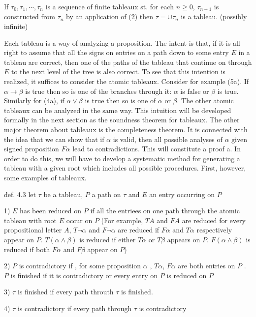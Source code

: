 \documentclass[a4paper, 10pt]{ctexbook} %
\begin{document}
If $\tau_0 , \tau_1 , \cdots , \tau_{n}$ is a sequence of finite tableaux st. for each $n \ge 0$, $\tau _{n+1}$ is constructed from $\tau_{n}$ by an application of (2) then $\tau = \cup \tau_{n}$ is a tableau. (possibly infinite)

Each tableau is a way of analyzing a proposition. The intent is that, if
it is all right to assume that all the signs on entries on a path down to some
entry $E$ in a tableau are correct, then one of the paths of the tableau that
continue on through $E$ to the next level of the tree is also correct. To see
that this intention is realized, it suffices to consider the atomic tableaux.
Consider for example (5a). If $\alpha \to \beta$ is true then so is one of the branches
through it: $\alpha$ is false or $\beta$ is true. Similarly for (4a), if $\alpha \vee \beta$ is true then so
is one of $\alpha$ or $\beta$. The other atomic tableaux can be analyzed in the same
way. This intuition will be developed formally in the next section as the
soundness theorem for tableaux. The other major theorem about tableaux
is the completeness theorem. It is connected with the idea that we can show
that if $\alpha$ is valid, then all possible analyses of $\alpha$ given signed proposition
$F\alpha$ lead to contradictions. This will constitute a proof a. In order to do
this, we will have to develop a systematic method for generating a tableau
with a given root which includes all possible procedures. First, however,
some examples of tableaux.

def. 4.3 let $\tau$ be a tableau, $P$ a path on $\tau$ and $E$ an entry occurring on $P$

1) $E$ has been reduced on $P $ if all the entriees on one path through the atomic tableau with root $E$ occur on $P$ (For example, $T A$ and $F A$ are reduced for every propositional letter $A$, $T \neg \alpha$ and $F \neg \alpha$ are reduced if $F\alpha$ and $T \alpha$ respectively appear on $P$. $T\left(\alpha \wedge \beta\right)$ is reduced if either $T\alpha$ or $T \beta$ appears on $P$. $F \left(\alpha \wedge \beta\right)$ is reduced if both $F\alpha$  and $F\beta$ appear on $P$)

2) $P$ is contradictory if , for some proposition $\alpha$ , $T\alpha$, $F\alpha$ are both entries on $P$ . $P$ is finished if it is contradictory or every entry on $P$ is reduced on $P$

3) $\tau$ is finished if every path throuth $\tau$ is finished.

4) $\tau$ is contradictory if every path through $\tau$ is contradictory
\end{document}
